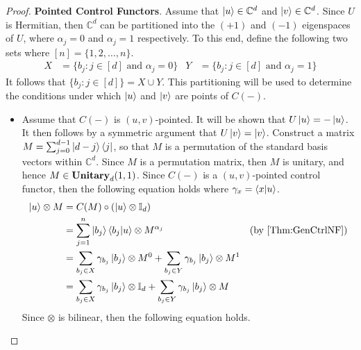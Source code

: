 \begin{proof}
    \vspace{1em}
    \noindent
    \textbf{Pointed Control Functors}.
    Assume that $\ket{u} \in \mathbb{C}^d$ and $\ket{v} \in \mathbb{C}^d$.
    Since $U$ is Hermitian, then $\mathbb{C}^d$ can be partitioned into the $(+1)$ and $(-1)$ eigenspaces of $U$, where $\alpha_j = 0$ and $\alpha_j = 1$ respectively.
    To this end, define the following two sets where $[n] = \{ 1, 2, \ldots, n \}$.
    \begin{align*}
        X &= \{ b_j : j \in [d] \text{ and } \alpha_j = 0 \}
        &
        Y &= \{ b_j : j \in [d] \text{ and } \alpha_j = 1 \}
    \end{align*}
    It follows that $\{ b_j : j \in [d] \} = X \cup Y$.
    This partitioning will be used to determine the conditions under which $\ket{u}$ and $\ket{v}$ are points of $C( - )$.
    \begin{itemize}
    \item Assume that $C( - )$ is $( u, v )$-pointed.
          It will be shown that $U\ket{u} = -\ket{u}$.
          It then follows by a symmetric argument that $U\ket{v} = \ket{v}$.
          Construct a matrix $M = \sum_{j=0}^{d-1} \ket{d-j} \bra{j}$, so that $M$ is a permutation of the standard basis vectors within $\mathbb{C}^d$.
          Since $M$ is a permutation matrix, then $M$ is unitary, and hence $M \in \mathbf{Unitary}_d( 1, 1 )$.
          Since $C( - )$ is a $( u, v )$-pointed control functor, then the following equation holds where $\gamma_x = \braket{x|u}$.
          \begin{align*}
              \ket{u} \otimes M
              &=
              C( M ) \circ \left( \ket{u} \otimes \mathbb{I}_d \right)
              \\
              &=
              \sum_{j=1}^n \ket{b_j} \braket{b_j|u} \otimes M^{\alpha_j}
              &
              ( \text{by \cref{Thm:GenCtrlNF}} )
              \\
              &=
              \sum_{b_j \in X} \gamma_{b_j} \ket{b_j} \otimes M^0
              +
              \sum_{b_j \in Y} \gamma_{b_j} \ket{b_j} \otimes M^1
              \\
              &=
              \sum_{b_j \in X} \gamma_{b_j} \ket{b_j} \otimes \mathbb{I}_d
              +
              \sum_{b_j \in Y} \gamma_{b_j} \ket{b_j} \otimes M
          \end{align*}
          Since $\otimes$ is bilinear, then the following equation holds.
          \begin{equation*}

\end{equation*}
\end{itemize}
\end{proof}
